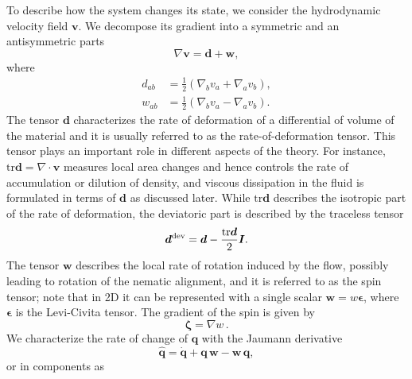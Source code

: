 \documentclass[12pt]{iopart}
\newcommand\ats[1]{\textcolor[rgb]{1,0.,1.}{#1}}
\begin{document}
	To describe how the system changes its state, we consider the hydrodynamic velocity field $\bm{v}$. We decompose its gradient into a symmetric and an antisymmetric parts
	\begin{equation} \label{gradv}
		\nabla \bm{v}  = \bm{d} + \bm{w},
	\end{equation}
	where 
	\begin{eqnarray}
		\label{eq:rate-of-deformation}
		{d}_{ab} &= \frac{1}{2}\left(\nabla_b {v}_a +\nabla_a{v}_b\right),\\ 
		\label{eq:spin}
		{w}_{ab} &= \frac{1}{2}\left(\nabla_b {v}_a -\nabla_a{v}_b\right). 
	\end{eqnarray}
	The tensor $\bm{d}$ characterizes the rate of deformation of a differential of volume of the material and it is usually referred to as the rate-of-deformation tensor. This tensor plays an important role in different aspects of the theory. For instance, $\text{tr}\bm{d}=\nabla \cdot \bm{v}$ measures local area changes and hence controls the rate of accumulation or dilution of density, and viscous dissipation in the fluid is formulated in terms of $\bm{d}$ as discussed later. While $\text{tr}\bm{d}$ describes the isotropic part of the rate of deformation, the deviatoric part is described by the traceless tensor
	\begin{equation}
		\bm{d}^{\rm dev} = \bm{d} - \frac{{\rm tr}\bm{d}}{2} \bm{I}.
	\end{equation}
	The tensor $\bm{w}$ describes the local rate of rotation induced by the flow, possibly leading to rotation of the nematic alignment, and it is referred to as the spin tensor; note that in 2D it can be represented with a single scalar $\bm{w}=w\bm{\epsilon}$, where $\bm{\epsilon}$ is the Levi-Civita tensor. The gradient of the spin is given by 
	\begin{equation} 
		\label{zeta}
		\bm{\zeta} = \nabla w \, .
	\end{equation} 
	We characterize the rate of change of $\bm{q}$ with the Jaumann derivative \cite{de1993}
	\begin{equation}
		\label{eq:Jaumann}
		\widehat{\bm{q}}= \dot{\bm{q}}  + \bm{q}\,\bm{w} -  \bm{w}\,\bm{q},
	\end{equation}
	or in components as
\end{document}
